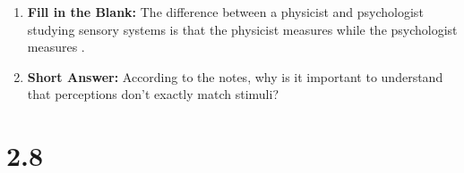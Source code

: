 \begin{enumerate}[label=\textbf{Q2.7.\arabic*}]
      
            

            
      \item \textbf{Fill in the Blank:} The difference between a physicist and psychologist studying sensory systems is that the physicist measures \underline{\hspace{3cm}} while the psychologist measures \underline{\hspace{3cm}}. \\
            
      \item \textbf{Short Answer:} According to the notes, why is it important to understand that perceptions don't exactly match stimuli? \\
\end{enumerate}

\newpage

\squigglyline


\section*{2.8}

